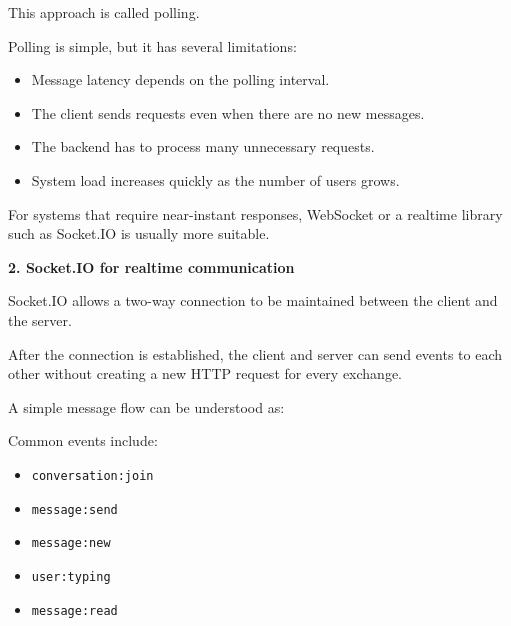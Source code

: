 This approach is called polling.

Polling is simple, but it has several limitations:

\begin{itemize}
\tightlist
\item
  Message latency depends on the polling interval.
\item
  The client sends requests even when there are no new messages.
\item
  The backend has to process many unnecessary requests.
\item
  System load increases quickly as the number of users grows.
\end{itemize}

For systems that require near-instant responses, WebSocket or a realtime
library such as Socket.IO is usually more suitable.

\vspace{0.5em}\noindent\textbf{2. Socket.IO for realtime
communication}\par

Socket.IO allows a two-way connection to be maintained between the
client and the server.

After the connection is established, the client and server can send
events to each other without creating a new HTTP request for every
exchange.

A simple message flow can be understood as:

\begin{Shaded}
\begin{Highlighting}[]
\end{Highlighting}
\end{Shaded}

Common events include:

\begin{itemize}
\tightlist
\item
  \texttt{conversation:join}
\item
  \texttt{message:send}
\item
  \texttt{message:new}
\item
  \texttt{user:typing}
\item
  \texttt{message:read}
\end{itemize}

